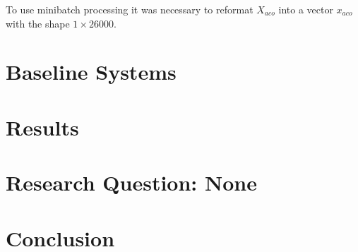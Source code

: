 \documentclass[11pt,a4paper]{article}
\begin{document}
	\noindent To use minibatch processing it was necessary to reformat $X_{aco}$ into a vector $x_{aco}$ with the shape $1 \times 26000$.
	
	
\section{Baseline Systems}

\section{Results}

\section{Research Question: None}

\section{Conclusion}



\nocite{*}
\end{document}
